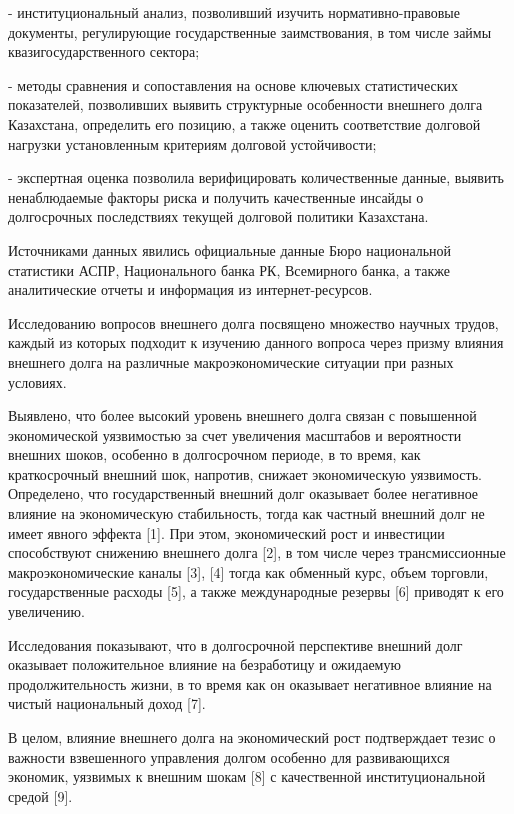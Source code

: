 \begin{multicols}{2}
- институциональный анализ, позволивший изучить нормативно-правовые
документы, регулирующие государственные заимствования, в том числе займы
квазигосударственного сектора;

- методы сравнения и сопоставления на основе ключевых статистических
показателей, позволивших выявить структурные особенности внешнего долга
Казахстана, определить его позицию, а также оценить соответствие
долговой нагрузки установленным критериям долговой устойчивости;

- экспертная оценка позволила верифицировать количественные данные,
выявить ненаблюдаемые факторы риска и получить качественные инсайды о
долгосрочных последствиях текущей долговой политики Казахстана.

Источниками данных явились официальные данные Бюро национальной
статистики АСПР, Национального банка РК, Всемирного банка, а также
аналитические отчеты и информация из интернет-ресурсов.

Исследованию вопросов внешнего долга посвящено множество научных трудов,
каждый из которых подходит к изучению данного вопроса через призму
влияния внешнего долга на различные макроэкономические ситуации при
разных условиях.

Выявлено, что более высокий уровень внешнего долга связан с повышенной
экономической уязвимостью за счет увеличения масштабов и вероятности
внешних шоков, особенно в долгосрочном периоде, в то время, как
краткосрочный внешний шок, напротив, снижает экономическую уязвимость.
Определено, что государственный внешний долг оказывает более негативное
влияние на экономическую стабильность, тогда как частный внешний долг не
имеет явного эффекта {[}1{]}. При этом, экономический рост и инвестиции
способствуют снижению внешнего долга {[}2{]}, в том числе через
трансмиссионные макроэкономические каналы {[}3{]}, {[}4{]} тогда как
обменный курс, объем торговли, государственные расходы {[}5{]}, а также
международные резервы {[}6{]} приводят к его увеличению.

Исследования показывают, что в долгосрочной перспективе внешний долг
оказывает положительное влияние на безработицу и ожидаемую
продолжительность жизни, в то время как он оказывает негативное влияние
на чистый национальный доход {[}7{]}.

В целом, влияние внешнего долга на экономический рост подтверждает тезис
о важности взвешенного управления долгом особенно для развивающихся
экономик, уязвимых к внешним шокам {[}8{]} с качественной
институциональной средой {[}9{]}.


\end{multicols}
